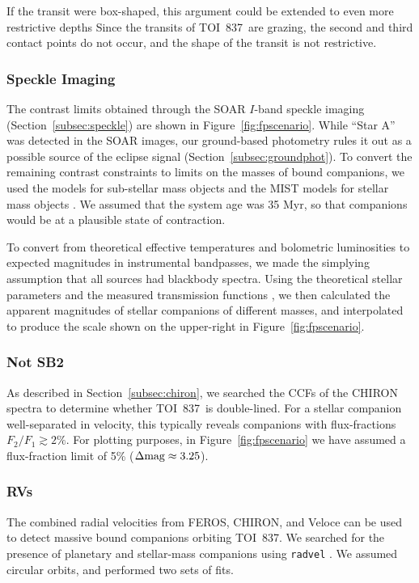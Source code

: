 \documentclass[12pt,twocolumn,tighten]{aastex63}
\newcommand{\tn}{TOI~837} %
\begin{document}
If the transit were box-shaped, this argument could be extended to
even more restrictive depths \citep[{\it
e.g.},][]{seager_unique_2003,vanderburg_hr858_2019,rizzuto_tess_2020}
Since the transits of \tn\ are grazing, the second and third
contact points do not occur, and the shape of the transit is not
restrictive.

\subsubsection{Speckle Imaging}
The contrast limits obtained through the SOAR $I$-band speckle imaging
(Section~\ref{subsec:speckle}) are shown in
Figure~\ref{fig:fpscenario}.  While ``Star A'' was detected in the
SOAR images, our ground-based photometry rules it out as a possible
source of the eclipse signal (Section~\ref{subsec:groundphot}).  To
convert the remaining contrast constraints to limits on the masses of
bound companions, we used the \citet{baraffe_evolutionary_2003} models
for sub-stellar mass objects and the MIST models for stellar mass
objects
\citep{paxton_modules_2011,paxton_modules_2013,paxton_modules_2015,dotter_mesa_2016,choi_mesa_2016}.
We assumed that the system age was 35 Myr, so that companions would be
at a plausible state of contraction.

To convert from theoretical effective temperatures and bolometric
luminosities to expected magnitudes in instrumental bandpasses, we
made the simplying assumption that all sources had blackbody spectra.
Using the theoretical stellar parameters and the measured transmission
functions \citep{tokovinin_ten_2018}, we then calculated the apparent
magnitudes of stellar companions of different masses, and interpolated
to produce the scale shown on the upper-right in
Figure~\ref{fig:fpscenario}.

\subsubsection{Not SB2}
As described in Section~\ref{subsec:chiron}, we searched the CCFs of
the CHIRON spectra to determine whether \tn\ is double-lined.  For a
stellar companion well-separated in velocity, this typically reveals
companions with flux-fractions $F_2/F_1 \gtrsim 2\%$.  For plotting
purposes, in Figure~\ref{fig:fpscenario} we have assumed a
flux-fraction limit of 5\% ($\Delta {\rm mag} \approx 3.25$).

\subsubsection{RVs}
The combined radial velocities from FEROS, CHIRON, and Veloce can be
used to detect massive bound companions orbiting \tn.  We searched for
the presence of planetary and stellar-mass companions using
\texttt{radvel} \citep{fulton_radvel_2018}.  We assumed circular
orbits, and performed two sets of fits.
\end{document}

